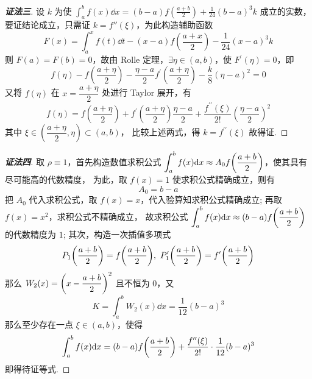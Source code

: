\begin{proof}[{\songti \textbf{证法三}}]
    设 $ k $ 为使 $ \displaystyle \int_{a}^{b} f(x) \dd  x=(b-a) f\left(\frac{a+b}{2}\right)+\frac{1}{24}(b-a)^{3} k $ 成立的实数，要证结论成立，只需证 $k=f''(\xi)$，为此构造辅助函数
    $$ \displaystyle F(x)=\int_{a}^{x} f(t) \dd  t-(x-a) f\left(\frac{a+x}{2}\right)-\frac{1}{24}(x-a)^{3} k $$
    则 $ F(a)=F(b)=0 $，故由 Rolle 定理，$\exists \eta \in(a, b) $，使 $ F^{\prime}(\eta)=0 $，即
    $$f(\eta)-f\left(\frac{a+\eta}{2}\right)-\frac{\eta-a}{2} f^{\prime}\left(\frac{a+\eta}{2}\right)-\frac{k}{8}(\eta-a)^{2}=0 $$
    又将 $ f(\eta) $ 在 $ x=\dfrac{a+\eta}{2} $ 处进行 Taylor 展开，有
    $$f(\eta)=f\left(\dfrac{a+\eta}{2}\right)+f^{\prime}\left(\frac{a+\eta}{2}\right) \frac{\eta-a}{2}+\frac{f^{\prime \prime}(\xi)}{2 !}\left(\frac{\eta-a}{2}\right)^{2}$$
    其中 $ \xi \in\left(\dfrac{a+\eta}{2}, \eta\right) \subset(a, b) $，
    比较上述两式，得 $ k=f^{\prime \prime}(\xi) $ 故得证.
\end{proof}
\begin{proof}[{\songti \textbf{证法四}}]
    取 $\rho\equiv1$，首先构造数值求积公式 $\displaystyle\int_{a}^{b}f(x)\dd x\approx A_0f\qty(\dfrac{a+b}{2})$，使其具有尽可能高的代数精度，
    为此，取 $f(x)=1$ 使求积公式精确成立，则有 $$A_0=b-a$$
    把 $A_0$ 代入求积公式，取 $f(x)=x$，代入验算知求积公式精确成立; 再取 $f(x)=x^2$，求积公式不精确成立，
    故求积公式 $\displaystyle\int_{a}^{b}f(x)\dd x\approx (b-a)f\qty(\dfrac{a+b}{2})$ 的代数精度为 $1$;
    其次，构造一次插值多项式
    $$P_1\qty(\dfrac{a+b}{2})=f\qty(\dfrac{a+b}{2}),~P'_1\qty(\dfrac{a+b}{2})=f'\qty(\dfrac{a+b}{2})$$
    那么 $W_2(x)=\qty(x-\dfrac{a+b}{2})^2$ 且不恒为 $0$，又
    $$K=\int_{a}^{b}W_2(x)\dd x=\dfrac{1}{12}(b-a)^3$$
    那么至少存在一点 $\xi\in(a,b)$，使得 $$\int_{a}^{b}f(x)\dd x=(b-a)f\qty(\dfrac{a+b}{2})+\dfrac{f''(\xi)}{2!}\cdot\dfrac{1}{12}(b-a)^3$$
    即得待证等式.
\end{proof}

